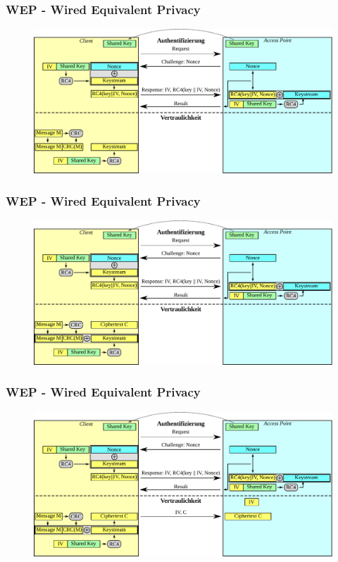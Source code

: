 \documentclass{beamer}
\begin{document}
\begin{frame}
\frametitle{WEP - Wired Equivalent Privacy}
\begin{figure}
	\includegraphics[width=1.0\linewidth]{figures/WEP_privacy_3.pdf}
\end{figure}
\end{frame}

\begin{frame}
\frametitle{WEP - Wired Equivalent Privacy}
\begin{figure}
	\includegraphics[width=1.0\linewidth]{figures/WEP_privacy_4.pdf}
\end{figure}
\end{frame}

\begin{frame}
\frametitle{WEP - Wired Equivalent Privacy}
\begin{figure}
	\includegraphics[width=1.0\linewidth]{figures/WEP_privacy_5.pdf}
\end{figure}
\end{frame}
\end{document}
